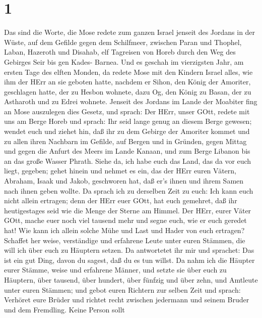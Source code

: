 \hypertarget{section}{%
\section{1}\label{section}}

 Das sind die Worte, die Mose redete zum ganzen Israel
jenseit des Jordans in der Wüste, auf dem Gefilde gegen dem Schilfmeer,
zwischen Paran und Thophel, Laban, Hazeroth und Disahab, 
elf Tagreisen von Horeb durch den Weg des Gebirges Seir bis gen Kades-
Barnea.  Und es geschah im vierzigsten Jahr, am ersten Tage
des elften Monden, da redete Mose mit den Kindern Israel alles, wie ihm
der HErr an sie geboten hatte,  nachdem er Sihon, den König
der Amoriter, geschlagen hatte, der zu Hesbon wohnete, dazu Og, den
König zu Basan, der zu Astharoth und zu Edrei wohnete. 
Jenseit des Jordans im Lande der Moabiter fing an Mose auszulegen dies
Gesetz, und sprach:  Der HErr, unser GOtt, redete mit uns am
Berge Horeb und sprach: Ihr seid lange genug an diesem Berge gewesen;
 wendet euch und ziehet hin, daß ihr zu dem Gebirge der
Amoriter kommet und zu allen ihren Nachbarn im Gefilde, auf Bergen und
in Gründen, gegen Mittag und gegen die Anfurt des Meers im Lande Kanaan,
und zum Berge Libanon bis an das große Wasser Phrath.  Siehe
da, ich habe euch das Land, das da vor euch liegt, gegeben; gehet hinein
und nehmet es ein, das der HErr euren Vätern, Abraham, Isaak und Jakob,
geschworen hat, daß er's ihnen und ihrem Samen nach ihnen geben wollte.
 Da sprach ich zu derselben Zeit zu euch: Ich kann euch
nicht allein ertragen;  denn der HErr euer GOtt, hat euch
gemehret, daß ihr heutigestages seid wie die Menge der Sterne am Himmel.
 Der HErr, eurer Väter GOtt, mache euer noch viel tausend
mehr und segne euch, wie er euch geredet hat!  Wie kann ich
allein solche Mühe und Last und Hader von euch ertragen? 
Schaffet her weise, verständige und erfahrene Leute unter euren Stämmen,
die will ich über euch zu Häuptern setzen.  Da antwortetet
ihr mir und sprachet: Das ist ein gut Ding, davon du sagest, daß du es
tun willst.  Da nahm ich die Häupter eurer Stämme, weise
und erfahrene Männer, und setzte sie über euch zu Häuptern, über
tausend, über hundert, über fünfzig und über zehn, und Amtleute unter
euren Stämmen;  und gebot euren Richtern zur selben Zeit
und sprach: Verhöret eure Brüder und richtet recht zwischen jedermann
und seinem Bruder und dem Fremdling.  Keine Person sollt
